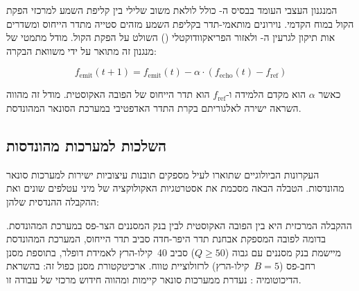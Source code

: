 המנגנון העצבי העומד בבסיס ה- כולל לולאת משוב שלילי בין קליפת השמע למרכזי הפקת הקול במוח הקדמי. נוירונים מותאמי-תדר בקליפת השמע מזהים סטייה מתדר הייחוס ומשדרים אות תיקון לגרעין ה- ולאזור הפריאקוודוקטלי () השולט על הפקת הקול. מודל מתמטי של מנגנון זה מתואר על ידי משוואת הבקרה:

\begin{equation}
f_{\text{emit}}(t+1) = f_{\text{emit}}(t) - \alpha \cdot (f_{\text{echo}}(t) - f_{\text{ref}})
\label{eq:ch02_dsc_control}
\end{equation}

כאשר $\alpha$ הוא מקדם הלמידה ו-$f_{\text{ref}}$ הוא תדר הייחוס של הפובה האקוסטית. מודל זה מהווה השראה ישירה לאלגוריתם בקרת התדר האדפטיבי במערכת הסונאר המהונדסת.

\subsection{השלכות למערכות מהונדסות}
\label{sec:engineering_implications}

העקרונות הביולוגיים שתוארו לעיל מספקים תובנות עיצוביות ישירות למערכות סונאר מהונדסות. הטבלה הבאה מסכמת את אסטרטגיות האקולוקציה של מיני עטלפים שונים ואת ההקבלה ההנדסית שלהן:

\begin{table}[htbp]
\centering
\caption{סיכום אסטרטגיות אקולוקציה של מיני עטלפים נבחרים. (Summary of bat species and their echolocation strategies.)}
\label{tab:ch02_bat_species}
\end{table}

ההקבלה המרכזית היא בין הפובה האקוסטית לבין בנק המסננים הצר-פס במערכת המהונדסת. בדומה לפובה המספקת אבחנת תדר היפר-חדה סביב תדר הייחוס, המערכת המהונדסת מיישמת בנק מסננים עם  גבוה ($Q \geq 50$) סביב 40~קילו-הרץ לאמידת דופלר, בתוספת מסנן רחב-פס ($B = 5$~קילו-הרץ) לרזולוציית טווח. ארכיטקטורת מסנן כפול זה: בהשראת הדיכוטומיה : נעדרת ממערכות סונאר קיימות ומהווה חידוש מרכזי של עבודה זו.

